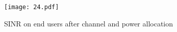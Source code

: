 




\begin{figure}[h!]
  \centering
  \label{joint_SINRcdf}
      \texttt{[image: 24.pdf]}
  \caption{SINR on end users after channel and power allocation}
\end{figure}

